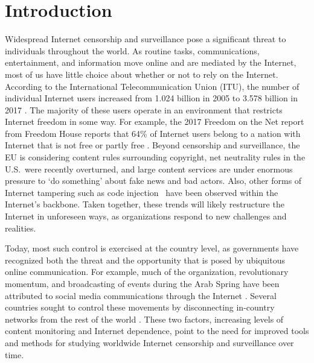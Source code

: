 \section{Introduction}

\par Widespread Internet censorship and surveillance pose a
significant threat to individuals throughout the world. As routine
tasks, communications, entertainment, and information move online and
are mediated by the Internet, most of us have little choice about
whether or not to rely on the Internet.  According to the
International Telecommunication Union (ITU), the number of individual
Internet users increased from 1.024 billion in 2005 to 3.578 billion
in 2017 \cite{itu}. The majority of these users operate in an
environment that restricts Internet freedom in some way. For example,
the 2017 Freedom on the Net report from Freedom House reports that
64\% of Internet users belong to a nation with Internet that is not
free or partly free \cite{FOTN}.  Beyond censorship and surveillance,
the EU is considering content rules surrounding copyright, net
neutrality rules in the U.S.\ were recently overturned, and large
content services are under enormous pressure to `do
something' about fake news and bad actors. Also, other forms of Internet
tampering such as code injection~\cite{badtraffic,191996} have been observed within the
Internet's backbone. Taken together, these
trends will likely restructure the Internet in unforeseen ways,
as organizations respond to new challenges and realities.

Today, most such control is exercised at the country level,
as governments have recognized both the threat and the opportunity
that is posed by ubiquitous online communication. For example, much
of the organization, revolutionary momentum, and broadcasting of
events during the Arab Spring have been attributed to social media
communications through the Internet \cite{arabspring}. Several countries
sought to control these movements by disconnecting in-country networks from the rest of the world \cite{BGPdisrupt}.
These two factors, increasing levels of content monitoring and
Internet dependence, point to the need for improved tools and methods
for studying worldwide Internet censorship and surveillance over time.

